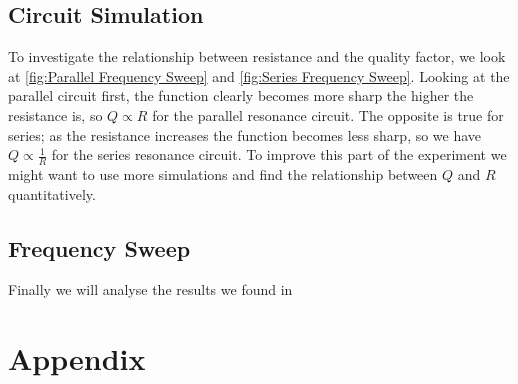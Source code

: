 \documentclass[12pt]{article}
\numberwithin{equation}{section}
\numberwithin{figure}{section}
\begin{document}
    \subsection{Circuit Simulation}\label{sec:Circuit Simulation}
    To investigate the relationship between resistance and the quality factor, we look at 
    \autoref{fig:Parallel Frequency Sweep} and \autoref{fig:Series Frequency Sweep}. Looking at the 
    parallel circuit first, the function clearly becomes more sharp the higher the resistance is, so 
    $Q\propto R$ for the parallel resonance circuit. The opposite is true for series; as the resistance 
    increases the function becomes less sharp, so we have $Q\propto \frac{1}{R}$ for the series 
    resonance circuit. To improve this part of the experiment we might want to use more simulations 
    and find the relationship between $Q$ and $R$ quantitatively. 

    \subsection{Frequency Sweep}\label{sec:Frequency Sweep}
    Finally we will analyse the results we found in 


    \newpage
    \section{Appendix}
    \setcounter{figure}{0} \renewcommand{\thefigure}{A.\arabic{figure}}
    
    
    


    
\end{document}
